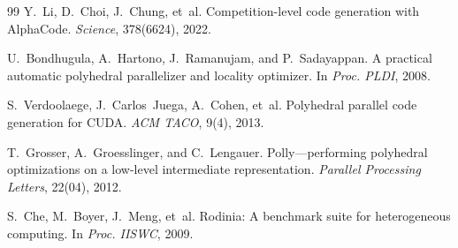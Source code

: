 \documentclass[sigconf]{acmart}
\begin{document}
\begin{thebibliography}{99}
Y.~Li, D.~Choi, J.~Chung, et~al.
\newblock Competition-level code generation with {AlphaCode}.
\newblock \emph{Science}, 378(6624), 2022.

U.~Bondhugula, A.~Hartono, J.~Ramanujam, and P.~Sadayappan.
\newblock A practical automatic polyhedral parallelizer and locality
  optimizer.
\newblock In \emph{Proc. PLDI}, 2008.

S.~Verdoolaege, J.~Carlos~Juega, A.~Cohen, et~al.
\newblock Polyhedral parallel code generation for {CUDA}.
\newblock \emph{ACM TACO}, 9(4), 2013.

T.~Grosser, A.~Groesslinger, and C.~Lengauer.
\newblock Polly---performing polyhedral optimizations on a low-level
  intermediate representation.
\newblock \emph{Parallel Processing Letters}, 22(04), 2012.

S.~Che, M.~Boyer, J.~Meng, et~al.
\newblock Rodinia: A benchmark suite for heterogeneous computing.
\newblock In \emph{Proc. IISWC}, 2009.

\end{thebibliography}
\end{document}
